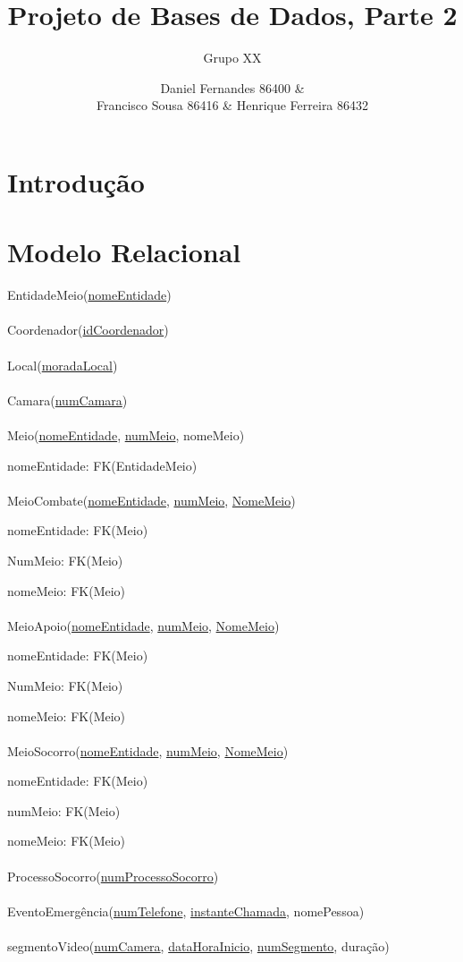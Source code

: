 \documentclass[12pt,a4paper]{article}
\author{Grupo XX \and Daniel Fernandes 86400 \& \\Francisco Sousa 86416 \& Henrique Ferreira 86432}
\title{Projeto de Bases de Dados, Parte 2}
\begin{document}
\maketitle
\newpage

\section{Introdução}
\section{Modelo Relacional}

EntidadeMeio(\underline{nomeEntidade}) \\\\
Coordenador(\underline{idCoordenador}) \\\\
Local(\underline{moradaLocal}) \\\\
Camara(\underline{numCamara}) \\\\
Meio(\underline{nomeEntidade}, \underline{numMeio}, nomeMeio)

nomeEntidade: FK(EntidadeMeio) \\\\
MeioCombate(\underline{nomeEntidade}, \underline{numMeio}, \underline{NomeMeio})

nomeEntidade: FK(Meio)

NumMeio: FK(Meio)

nomeMeio: FK(Meio) \\\\
MeioApoio(\underline{nomeEntidade}, \underline{numMeio}, \underline{NomeMeio})

nomeEntidade: FK(Meio)

NumMeio: FK(Meio)

nomeMeio: FK(Meio) \\\\
MeioSocorro(\underline{nomeEntidade}, \underline{numMeio}, \underline{NomeMeio})

nomeEntidade: FK(Meio)

numMeio: FK(Meio)

nomeMeio: FK(Meio) \\\\
ProcessoSocorro(\underline{numProcessoSocorro}) \\\\
EventoEmergência(\underline{numTelefone}, \underline{instanteChamada}, nomePessoa) \\\\
segmentoVideo(\underline{numCamera}, \underline{dataHoraInicio}, \underline{numSegmento}, duração)
\end{document}

